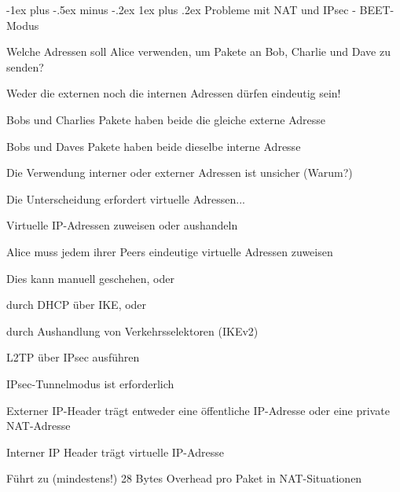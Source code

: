 \documentclass[a4paper]{article}
\makeatletter
\renewcommand{\subsubsection}{\@startsection{subsubsection}{3}{0mm}%
 {-1ex plus -.5ex minus -.2ex}%
 {1ex plus .2ex}%
 {\normalfont\small\bfseries}}
\makeatother
\begin{document}
\begin{multicols}{3}
      \subsubsection{Probleme mit NAT und IPsec - BEET-Modus}
      \begin{itemize*}
            \item Welche Adressen soll Alice verwenden, um Pakete an Bob, Charlie und Dave zu senden?
            \item Weder die externen noch die internen Adressen dürfen eindeutig sein!
            \begin{itemize*}
                  \item Bobs und Charlies Pakete haben beide die gleiche externe Adresse
                  \item Bobs und Daves Pakete haben beide dieselbe interne Adresse
                  \item Die Verwendung interner oder externer Adressen ist unsicher (Warum?)
                  \item Die Unterscheidung erfordert virtuelle Adressen...
            \end{itemize*}
            \item Virtuelle IP-Adressen zuweisen oder aushandeln
            \begin{itemize*}
                  \item Alice muss jedem ihrer Peers eindeutige virtuelle Adressen zuweisen
                  \item Dies kann manuell geschehen, oder
                  \item durch DHCP über IKE, oder
                  \item durch Aushandlung von Verkehrsselektoren (IKEv2)
                  \item L2TP über IPsec ausführen
            \end{itemize*}
            \item IPsec-Tunnelmodus ist erforderlich
            \begin{itemize*}
                  \item Externer IP-Header trägt entweder eine öffentliche IP-Adresse oder eine private NAT-Adresse
                  \item Interner IP Header trägt virtuelle IP-Adresse
                  \item Führt zu (mindestens!) 28 Bytes Overhead pro Paket in NAT-Situationen

\end{itemize*}
\end{itemize*}
\end{multicols}
\end{document}
